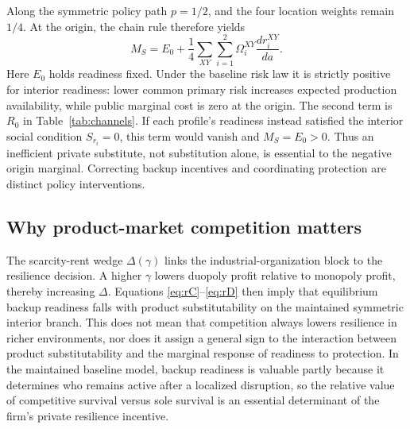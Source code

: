 Along the symmetric policy path $p=1/2$, and the four location weights remain $1/4$. At the origin, the chain rule therefore yields
\begin{equation}
M_S=E_0+\frac14\sum_{XY}\sum_{i=1}^2
\Omega_i^{XY}\frac{dr_i^{XY}}{da}.
\label{eq:readiness-chain-rule}
\end{equation}
Here $E_0$ holds readiness fixed. Under the baseline risk law it is strictly positive for interior readiness: lower common primary risk increases expected production availability, while public marginal cost is zero at the origin. The second term is $R_0$ in Table~\ref{tab:channels}. If each profile's readiness instead satisfied the interior social condition $S_{r_i}=0$, this term would vanish and $M_S=E_0>0$. Thus an inefficient private substitute, not substitution alone, is essential to the negative origin marginal. Correcting backup incentives and coordinating protection are distinct policy interventions.

\subsection{Why product-market competition matters}

The scarcity-rent wedge $\Delta(\gamma)$ links the industrial-organization block to the resilience decision. A higher $\gamma$ lowers duopoly profit relative to monopoly profit, thereby increasing $\Delta$. Equations \eqref{eq:rC}--\eqref{eq:rD} then imply that equilibrium backup readiness falls with product substitutability on the maintained symmetric interior branch. This does not mean that competition always lowers resilience in richer environments, nor does it assign a general sign to the interaction between product substitutability and the marginal response of readiness to protection. In the maintained baseline model, backup readiness is valuable partly because it determines who remains active after a localized disruption, so the relative value of competitive survival versus sole survival is an essential determinant of the firm's private resilience incentive.
